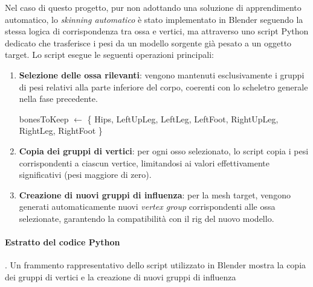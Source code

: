 Nel caso di questo progetto, pur non adottando una soluzione di apprendimento automatico, lo \textit{skinning automatico} è stato implementato in Blender seguendo la stessa logica di corrispondenza tra ossa e vertici, ma attraverso uno script Python dedicato che trasferisce i pesi da un modello sorgente già pesato a un oggetto target.
Lo script esegue le seguenti operazioni principali:

\begin{enumerate}
    \item \textbf{Selezione delle ossa rilevanti}: vengono mantenuti esclusivamente i gruppi di pesi relativi alla parte inferiore del corpo, coerenti con lo scheletro generale nella fase precedente.

    \vspace{5mm}
    \begin{minipage}{1\linewidth}
    \begin{algorithm}[H]
    \caption{DefineBonesToTransfer}
    \label{alg:bones_to_transfer}
    
    
    
    bonesToKeep $\leftarrow$ \{ Hips, LeftUpLeg, LeftLeg, LeftFoot,
                            RightUpLeg, RightLeg, RightFoot \}\;
    
    \end{algorithm}
    \end{minipage}
   
    \item \textbf{Copia dei gruppi di vertici}: per ogni osso selezionato, lo script copia i pesi corrispondenti a ciascun vertice, limitandosi ai valori effettivamente significativi (pesi maggiore di zero).

    \item \textbf{Creazione di nuovi gruppi di influenza}: per la mesh target, vengono generati automaticamente nuovi \textit{vertex group} corrispondenti alle ossa selezionate, garantendo la compatibilità con il rig del nuovo modello.
\end{enumerate}

\paragraph{Estratto del codice Python}.
Un frammento rappresentativo dello script utilizzato in Blender mostra la copia dei gruppi di vertici e la creazione di nuovi gruppi di influenza

